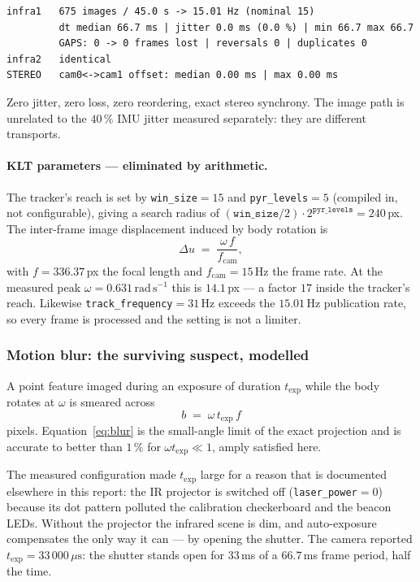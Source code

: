 \begin{verbatim}
infra1   675 images / 45.0 s -> 15.01 Hz (nominal 15)
         dt median 66.7 ms | jitter 0.0 ms (0.0 %) | min 66.7 max 66.7
         GAPS: 0 -> 0 frames lost | reversals 0 | duplicates 0
infra2   identical
STEREO   cam0<->cam1 offset: median 0.00 ms | max 0.00 ms
\end{verbatim}

Zero jitter, zero loss, zero reordering, exact stereo synchrony. The image
path is unrelated to the $40\,\%$ IMU jitter measured separately: they are
different transports.

\paragraph{KLT parameters --- eliminated by arithmetic.} The tracker's reach is
set by \texttt{win\_size}$=15$ and \texttt{pyr\_levels}$=5$ (compiled in, not
configurable), giving a search radius of
$(\texttt{win\_size}/2)\cdot 2^{\texttt{pyr\_levels}} = 240$\,px. The
inter-frame image displacement induced by body rotation is
%
\begin{equation}
  \Delta u \;=\; \frac{\omega\,f}{f_{\mathrm{cam}}},
  \label{eq:interframe}
\end{equation}
%
with $f=336.37$\,px the focal length and $f_{\mathrm{cam}}=15$\,Hz the frame
rate. At the measured peak $\omega=0.631\,\mathrm{rad\,s^{-1}}$ this is
$14.1$\,px --- a factor $17$ inside the tracker's reach. Likewise
\texttt{track\_frequency}$=31$\,Hz exceeds the $15.01$\,Hz publication rate, so
every frame is processed and the setting is not a limiter.

\subsubsection{Motion blur: the surviving suspect, modelled}

A point feature imaged during an exposure of duration $t_{\mathrm{exp}}$ while
the body rotates at $\omega$ is smeared across
%
\begin{equation}
  b \;=\; \omega \, t_{\mathrm{exp}} \, f
  \label{eq:blur}
\end{equation}
%
pixels. Equation~\eqref{eq:blur} is the small-angle limit of the exact
projection and is accurate to better than $1\,\%$ for
$\omega t_{\mathrm{exp}} \ll 1$, amply satisfied here.

The measured configuration made $t_{\mathrm{exp}}$ large for a reason that is
documented elsewhere in this report: the IR projector is switched off
(\texttt{laser\_power}$=0$) because its dot pattern polluted the calibration
checkerboard and the beacon LEDs. Without the projector the infrared scene is
dim, and auto-exposure compensates the only way it can --- by opening the
shutter. The camera reported $t_{\mathrm{exp}}=33\,000\,\mu\mathrm{s}$: the
shutter stands open for $33$\,ms of a $66.7$\,ms frame period, half the time.

